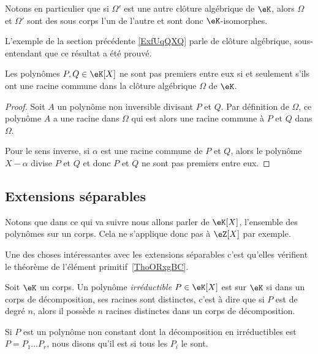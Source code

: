 Notons en particulier que si \( \Omega'\) est une autre clôture algébrique de \( \eK\), alors \( \Omega\) et \( \Omega'\) sont des sous corps l'un de l'autre et sont donc \( \eK\)-isomorphes.

\begin{probleme}        \label{PROBooTOUEooCJSWgR}
L'exemple de la section précédente \ref{ExfUqQXQ} parle de clôture algébrique, sous-entendant que ce résultat a été prouvé. 
\end{probleme}

\begin{lemma}
    Les polynômes \( P,Q\in \eK[X]\) ne sont pas premiers entre eux si et seulement s'ils ont une racine commune dans la clôture algébrique \( \Omega\) de \( \eK\).
\end{lemma}

\begin{proof}
    Soit \( A\) un polynôme non inversible divisant \( P\) et $Q$. Par définition de \( \Omega\), ce polynôme \( A\) a une racine dans \( \Omega\) qui est alors une racine commune à \( P\) et \( Q\) dans \( \Omega\).

    Pour le sens inverse, si \( \alpha\) est une racine commune de \( P\) et \( Q\), alors le polynôme \( X-\alpha\) divise \( P\) et \( Q\) et donc \( P\) et \( Q \) ne sont pas premiers entre eux.
\end{proof}


\subsection{Extensions séparables}

Notons que dans ce qui va suivre nous allons parler de \( \eK[X]\), l'ensemble des polynômes sur un corps. Cela ne s'applique donc pas à \( \eZ[X]\) par exemple.

Une des choses intéressantes avec les extensions séparables c'est qu'elles vérifient le théorème de l'élément primitif~\ref{ThoORxgBC}.

\begin{definition}      \label{DEFooLXSBooCHIUFU}
    Soit \( \eK\) un corps. Un polynôme \emph{irréductible} \( P\in \eK[X]\) est  sur $\eK$ si dans un corps de décomposition, ses racines sont distinctes, c'est à dire que si \( P\) est de degré \( n\), alors il possède \( n\) racines distinctes dans un corps de décomposition.

    Si \( P\) est un polynôme non constant dont la décomposition en irréductibles est \( P=P_1\ldots P_r\), nous disons qu'il est  si tous les \( P_i\) le sont.
\end{definition}

